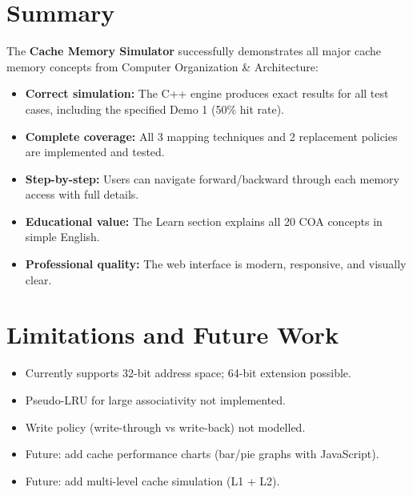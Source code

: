 \documentclass[12pt,a4paper]{report}
\begin{document}
\section{Summary}
The \textbf{Cache Memory Simulator} successfully demonstrates all major cache
memory concepts from Computer Organization \& Architecture:

\begin{itemize}
  \item \textbf{Correct simulation:} The C++ engine produces exact results for
        all test cases, including the specified Demo 1 (50\% hit rate).
  \item \textbf{Complete coverage:} All 3 mapping techniques and 2 replacement
        policies are implemented and tested.
  \item \textbf{Step-by-step:} Users can navigate forward/backward through each
        memory access with full details.
  \item \textbf{Educational value:} The Learn section explains all 20 COA concepts
        in simple English.
  \item \textbf{Professional quality:} The web interface is modern, responsive,
        and visually clear.
\end{itemize}

\section{Limitations and Future Work}
\begin{itemize}
  \item Currently supports 32-bit address space; 64-bit extension possible.
  \item Pseudo-LRU for large associativity not implemented.
  \item Write policy (write-through vs write-back) not modelled.
  \item Future: add cache performance charts (bar/pie graphs with JavaScript).
  \item Future: add multi-level cache simulation (L1 + L2).
\end{itemize}

\end{document}
